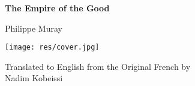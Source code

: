 \pagestyle{empty}
\begin{center}
\bfseries
\nbvspace[1]
\Huge
{\nbtitlestretch\huge
The Empire of the Good}

\nbvspace[3]
\Large{Philippe Muray}

\nbvspace[3]
\texttt{[image: res/cover.jpg]}

\nbvspace[3]
\footnotesize{Translated to English from the Original French by\\
Nadim Kobeissi}

\normalsize
\nbvspace[1]
\end{center}